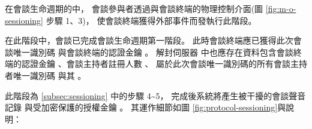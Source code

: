     在會談生命週期的中，
會談參與者透過與會談終端的物理控制介面(圖 \ref{fig:m-o-sessioning} 步驟 1、3)，
使會談終端獲得外部事件而發執行此階段。

    在此階段中，會談已完成會談生命週期第一階段。
此時會談終端應已獲得此次會談唯一識別碼 \DEFsessionID 與會談終端的認證金鑰 \DEFmboxKey。
解封伺服器 \DEFserver 中也應存在資料包含會談終端的認證金鑰 \DEFmboxKey、會談主持者註冊人數 \DEFowreg、
屬於此次會談唯一識別碼的所有會談主持者唯一識別碼 \DEFownerID 與其 \DEFpublicKey。

    此階段為 \ref{subsec:sessioning} 中的步驟 4\textasciitilde5，
完成後系統將產生被干擾的會談聲音記錄 \DEFrecJ 與受加密保護的授權金鑰 \DEFakEnc。
其運作細節如圖 \ref{fig:protocol-sessioning}與說明：

